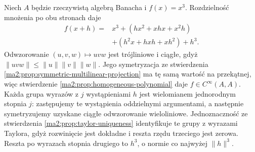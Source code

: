 \begin{przyklad}
\label{ma2:ex:taylor-noncommutative}
Niech $A$ będzie rzeczywistą algebrą Banacha i $f(x)=x^3$.
Rozdzielność mnożenia po obu stronach daje
\[
 \begin{aligned}
 f(x+h)={}&x^3+(hx^2+xhx+x^2h)\\
          &+(h^2x+hxh+xh^2)+h^3.
 \end{aligned}
\]
Odwzorowanie $(u,v,w)\mapsto uvw$ jest trójliniowe
i ciągłe, gdyż $\|uvw\|\le\|u\|\|v\|\|w\|$.
Jego symetryzacja ze stwierdzenia
\ref{ma2:prop:symmetric-multilinear-projection}
ma tę samą wartość na przekątnej, więc stwierdzenie
\ref{ma2:prop:homogeneous-polynomial} daje
$f\in C^\infty(A,A)$. Każda grupa wyrazów z $j$
wystąpieniami $h$ jest wielomianem jednorodnym
stopnia $j$: zastępujemy te wystąpienia oddzielnymi
argumentami, a następnie symetryzujemy uzyskane
ciągłe odwzorowanie wieloliniowe.
Jednoznaczność ze stwierdzenia
\ref{ma2:prop:taylor-uniqueness} identyfikuje te
grupy z wyrazami Taylora, gdyż rozwinięcie jest
dokładne i reszta rzędu trzeciego jest zerowa.
Reszta po wyrazach stopnia drugiego to $h^3$,
o normie co najwyżej $\|h\|^3$.
\end{przyklad}

